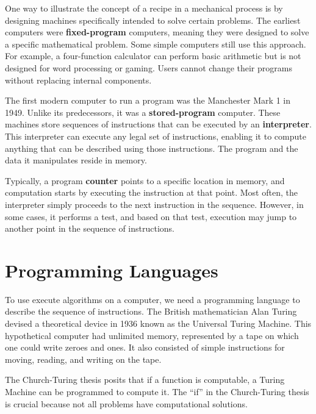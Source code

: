 \documentclass[
  letterpaper,
  DIV=11,
  numbers=noendperiod]{scrreprt}
\begin{document}
One way to illustrate the concept of a recipe in a mechanical process is
by designing machines specifically intended to solve certain problems.
The earliest computers were \textbf{fixed-program} computers, meaning
they were designed to solve a specific mathematical problem. Some simple
computers still use this approach. For example, a four-function
calculator can perform basic arithmetic but is not designed for word
processing or gaming. Users cannot change their programs without
replacing internal components.

The first modern computer to run a program was the Manchester Mark 1 in
1949. Unlike its predecessors, it was a \textbf{stored-program}
computer. These machines store sequences of instructions that can be
executed by an \textbf{interpreter}. This interpreter can execute any
legal set of instructions, enabling it to compute anything that can be
described using those instructions. The program and the data it
manipulates reside in memory.

Typically, a program \textbf{counter} points to a specific location in
memory, and computation starts by executing the instruction at that
point. Most often, the interpreter simply proceeds to the next
instruction in the sequence. However, in some cases, it performs a test,
and based on that test, execution may jump to another point in the
sequence of instructions.

\hypertarget{programming-languages}{%
\section{Programming Languages}\label{programming-languages}}

To use execute algorithms on a computer, we need a programming language
to describe the sequence of instructions. The British mathematician Alan
Turing devised a theoretical device in 1936 known as the Universal
Turing Machine. This hypothetical computer had unlimited memory,
represented by a tape on which one could write zeroes and ones. It also
consisted of simple instructions for moving, reading, and writing on the
tape.

The Church-Turing thesis posits that if a function is computable, a
Turing Machine can be programmed to compute it. The ``if'' in the
Church-Turing thesis is crucial because not all problems have
computational solutions.
\end{document}
